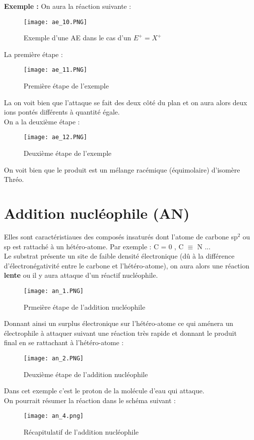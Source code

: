 \documentclass[a4paper, oneside]{book}
\begin{document}
\textbf{Exemple :} On aura la réaction suivante :
\begin{figure}[!h]
    \centering
    \texttt{[image: ae\_10.PNG]}
    \caption{Exemple d'une AE dans le cas d'un $E^+ = X^+$}
    \label{fig:my_label}
\end{figure}

La première étape : 
\begin{figure}[!h]
    \centering
    \texttt{[image: ae\_11.PNG]}
    \caption{Première étape de l'exemple}
    \label{fig:my_label}
\end{figure}
\newpage
La on voit bien que l'attaque se fait des deux côté du plan et on aura alors deux ions pontés différents à quantité égale.\\
On a la deuxième étape :
\begin{figure}[!h]
    \centering
    \texttt{[image: ae\_12.PNG]}
    \caption{Deuxième étape de l'exemple}
    \label{fig:my_label}
\end{figure}

On voit bien que le produit est un mélange racémique (équimolaire) d'isomère Thréo.
\section{Addition nucléophile (AN)}
Elles sont caractéristiaues des composés insaturés dont l'atome de carbone sp$^2$ ou sp est rattaché à un hétéro-atome. Par exemple : C = 0 , C $\equiv$ N ...\\
Le substrat présente un site de faible densité électronique (dû à la différence d'électronégativité entre le carbone et l'hétéro-atome), on aura alors une réaction \textbf{lente} ou il y aura attaque d'un réactif nucléophile.
\begin{figure}[!h]
    \centering
    \texttt{[image: an\_1.PNG]}
    \caption{Prmeière étape de l'addition nucléophile}
    \label{fig:my_label}
\end{figure}

Donnant ainsi un surplus électronique sur l'hétéro-atome ce qui aménera un électrophile à attaquer suivant une réaction très rapide et donnant le produit final en se rattachant à l'hétéro-atome :
\begin{figure}[!h]
    \centering
    \texttt{[image: an\_2.PNG]}
    \caption{Deuxième étape de l'addition nucléophile}
    \label{fig:my_label}
\end{figure}

Dans cet exemple c'est le proton de la molécule d'eau qui attaque.\\
On pourrait résumer la réaction dans le schéma suivant :
\begin{figure}[!h]
    \centering
    \texttt{[image: an\_4.png]}
    \caption{Récapitulatif de l'addition nucléophile}
    \label{fig:my_label}
\end{figure}
\end{document}
